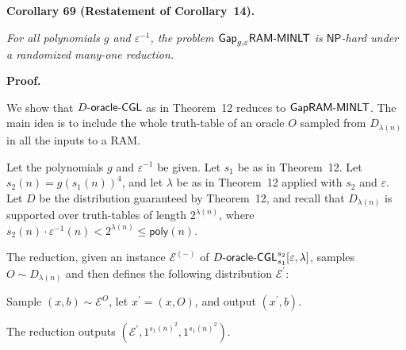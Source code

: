 \documentclass[10pt,a4paper]{article}
\begin{document}


\par\medskip\noindent\textbf{
\textbf{Corollary 69}\textbf{ }(Restatement of Corollary 14)\textbf{.}
}\par



\emph{For all polynomials $g$ and $\varepsilon^{-1}$, the problem ${\sf Gap}_{g,\varepsilon}{\sf RAM}\text{-}{\sf MINLT}$ is ${\mathsf{NP}}$-hard under a randomized many-one reduction.}\par







\par\medskip\noindent\textbf{Proof.}\par




We show that $D\text{-}{\sf oracle}\text{-}{\sf CGL}$ as in Theorem 12 reduces to ${\sf Gap}{\sf RAM}\text{-}{\sf MINLT}$. The main idea is to include the whole truth-table of an oracle $O$ sampled from $D_{\lambda(n)}$ in all the inputs to a RAM.\par




Let the polynomials $g$ and $\varepsilon^{-1}$ be given. Let $s_{1}$ be as in Theorem 12. Let $s_{2}(n)=g(s_{1}(n))^{4}$, and let $\lambda$ be as in Theorem 12 applied with $s_{2}$ and $\varepsilon$. Let $D$ be the distribution guaranteed by Theorem 12, and recall that $D_{\lambda(n)}$ is supported over truth-tables of length $2^{\lambda(n)}$, where $s_{2}(n)\cdot\varepsilon^{-1}(n)<2^{\lambda(n)}\leq{\mathsf{poly}}(n)$.\par




The reduction, given an instance $\mathcal{E}^{(-)}$ of $D\text{-}{\sf oracle}\text{-}{\sf CGL}_{s_{1}}^{s_{2}}[\varepsilon,\lambda]$, samples $O\sim D_{\lambda(n)}$ and then defines the following distribution $\mathcal{E}^{\prime}$:\par



Sample $(x,b)\sim\mathcal{E}^{O}$, let $x^{\prime}=(x,O)$, and output $(x^{\prime},b)$.\par



The reduction outputs $(\mathcal{E}^{\prime},1^{s_{1}(n)^{2}},1^{s_{1}(n)^{2}})$.\par
\end{document}
